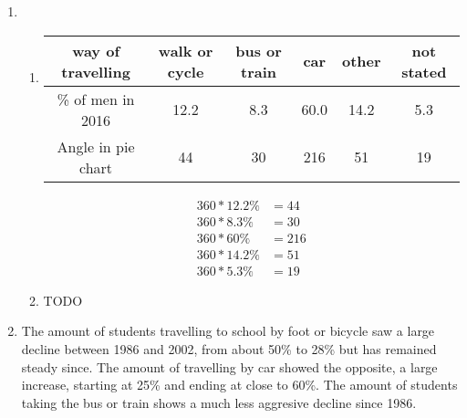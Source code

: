 \documentclass[11pt]{article}
\begin{document}
\begin{enumerate}
\begin{enumerate}
            \item
                \begin{enumerate}
                    \item
                        \begin{center}
                            \begin{tabular}{ |c|c|c|c|c|c| } 
                                \hline
                                way of travelling&walk or cycle&bus or train&car&other&not stated\\
                                \hline
                                \% of men in 2016&12.2&8.3&60.0&14.2&5.3\\
                                \hline
                                Angle in pie chart&44&30&216&51&19\\
                                \hline
                            \end{tabular}
                    \end{center}
                        \begin{equation*}
                            \begin{split}
                                360*12.2\%&=44\\
                                360*8.3\%&=30\\
                                360*60\%&=216\\
                                360*14.2\%&=51\\
                                360*5.3\%&=19
                            \end{split}
                        \end{equation*}
                    \item TODO
                \end{enumerate}
                \item The amount of students travelling to school by foot or bicycle saw a large decline between 1986 and 2002, from about 50\% to 28\% but has remained steady since.
                    The amount of travelling by car showed the opposite, a large increase, starting at 25\% and ending at close to 60\%.
                    The amount of students taking the bus or train shows a much less aggresive decline since 1986.
            \end{enumerate}
            

\end{enumerate}
\end{document}

